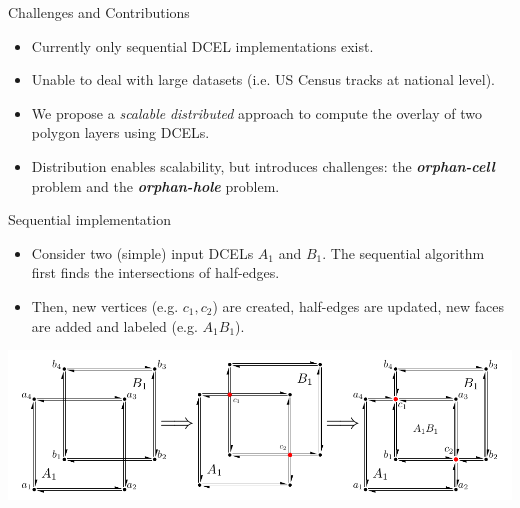 \documentclass{beamer}
\begin{document}
    \begin{frame}{Challenges and Contributions}
        \begin{itemize}
            \item Currently only sequential DCEL implementations exist.
            \item Unable to deal with large datasets (i.e. US Census tracks at national level).
            \item We propose a \textit{scalable} \textit{distributed} approach to compute the overlay of two polygon layers using DCELs.
            \item Distribution enables scalability, but introduces challenges: the \textbf{\textit{orphan-cell}} problem and the \textbf{\textit{orphan-hole}} problem.
        \end{itemize}
   
    \end{frame}
    
    \begin{frame}{Sequential implementation}
        \begin{itemize}
                \item Consider two (simple) input DCELs $A_1$ and $B_1$.  The sequential algorithm first finds the intersections of half-edges.
                \item Then, new vertices (e.g. $c_1, c_2$) are created,  half-edges are updated, new faces are added and labeled (e.g. $A_1B_1$).
        \end{itemize}
        \vspace{0.5cm}
    
        \centering
        \includegraphics[width=\textwidth]{figures/dcel_seq}
    \end{frame}
    
\end{document}
